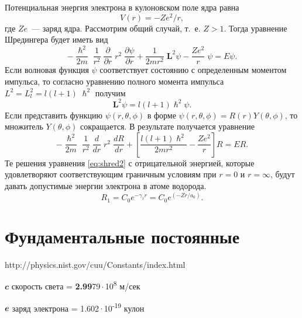 \documentclass[a4paper,14pt, openany, twoside, draft]{extbook} %
\newcommand{\vect}[1]{\mathbf{#1}}
\begin{document}
Потенциальная энергия электрона в кулоновском поле ядра равна
\begin{equation}
  \label{eq:potenergy}
V(r)=-Ze^2/r,
\end{equation}
где $Ze$~--- заряд ядра.  Рассмотрим общий случай, т.~е. $Z>1$.  Тогда уравнение Шредингера будет иметь вид
\begin{equation}
  \label{eq:shred1}
-\frac{\hslash^2}{2m}\;\frac{1}{r^2}\;\frac{\partial}{\partial r}\;r^2\;\frac{\partial \psi}{\partial r}+\frac{1}{2mr^2}\;{\mathbf{L}}^2\psi-\frac{Ze^2}{r}\;\psi=E\psi.
\end{equation}
Если волновая функция $\psi$ соответствует состоянию с определенным моментом импульса, то согласно уравнению полного момента импульса $L^2=L_{l}^2=l(l+1)\;\hslash^2$ получим
\begin{equation}
  \label{eq:impuls}
{\vect{L}}^2\psi=l(l+1)\hslash^2\psi.
\end{equation}
Если представить функцию $\psi(r, \theta, \phi)$ в форме $\psi (r, \theta, \phi)=R(r)Y(\theta, \phi)$, то множитель $Y(\theta, \phi)$ сокращается.  В результате получается уравнение
\begin{equation}
  \label{eq:shred2}
-\frac{\hslash^2}{2m}\;\frac{1}{r^2}\;\frac{d}{dr}\;r^2\;\frac{dR}{dr}+
\left[\frac{l(l+1)\hslash^2}{2mr^2}-\frac{Ze^2}{r}\right]R=ER.
\end{equation}
Те решения уравнения \ref{eq:shred2} с отрицательной энергией, которые удовлетворяют соответствующим граничным условиям при $r=0$ и $r=\infty$, будут давать допустимые энергии электрона в атоме водорода.
\begin{equation}
  \label{eq:wavefunction}
R_1=C_0e^{-\gamma_1r}=C_0e^{(-{Zr}/{a_0})}.
\end{equation}

\newpage
\chapter*{Фундаментальные постоянные}
{http://physics.nist.gov/cuu/Constants/index.html}


$\mathbfit{c}$  скорость света =  \textbf{2.99}79\,$\cdot$\,10\textsuperscript{8} м/сек %

$\mathbfit{e}$  заряд электрона = 1.602\,$\cdot$\,10\textsuperscript{-19} кулон
\end{document}
